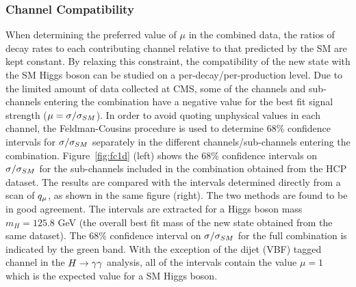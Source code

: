 \subsubsection{Channel Compatibility}
When determining the preferred value of $\mu$ in the combined data, 
the ratios of decay rates to each contributing channel relative 
to that predicted by the SM are kept constant. 
By relaxing this constraint, the compatibility of the new state 
with the SM Higgs boson can be studied on a per-decay/per-production level. 
Due to the limited amount of data collected at CMS, 
some of the channels and sub-channels entering the combination
have a negative value for the best fit signal strength ($\mu=\sigma/\sigma_{SM}$).
In order to avoid quoting unphysical values in each channel, the Feldman-Cousins
procedure is used to determine 68\% confidence intervals for $\sigma/\sigma_{SM}$ separately in the different
channels/sub-channels entering the combination. 
Figure~\ref{fig:fc1d} (left) shows the 68\% confidence intervals on $\sigma/\sigma_{SM}$ for the sub-channels 
included in the combination obtained from the HCP dataset. The results are compared with the intervals determined
directly from a scan of $q_{\mu}$, as shown in the same figure (right). The two methods are found
to be in good agreement. The intervals are extracted for a Higgs boson 
mass $m_{H}=125.8$ GeV (the overall best fit mass of the new state obtained from the
same dataset). The 68\% confidence interval on $\sigma/\sigma_{SM}$ for the full combination is indicated
by the green band. With the exception of the dijet (VBF) tagged channel in the 
$H\rightarrow\gamma\gamma$ analysis, all of the intervals contain the value $\mu=1$ which is the expected value for 
a SM Higgs boson. 
